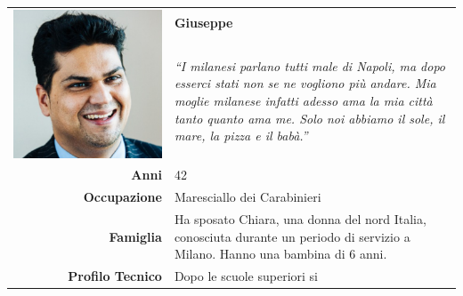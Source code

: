 \begin{table}[H]
	\begin{centering}
	\begin{tabular} { | r  p{10cm} | }
		\hline
		\multirow{2}{*}{
			\begin{minipage}{.18 \textheight}
				\vspace{0.1in}
				\includegraphics[width=\linewidth]{img/personas/giuseppe.png}
			\end{minipage}
		}
	 	& \vspace{0.1 in}\Large\textbf{Giuseppe} \\ 
		& \vspace{0.1 in}\large{\emph{``I milanesi parlano tutti male di
Napoli, ma dopo esserci stati non se ne vogliono più andare. Mia moglie
milanese infatti adesso ama la mia città tanto quanto ama me. Solo noi abbiamo il
sole, il mare, la pizza e il babà.''}}\\[8ex]
		\hline
		\textbf{Anni} & 42 \\ \hline
		\textbf{Occupazione} & Maresciallo dei Carabinieri \\ \hline
		\textbf{Famiglia} & Ha sposato Chiara, una donna del nord
Italia, conosciuta durante un periodo di servizio a Milano. Hanno una
bambina di 6 anni.\\ \hline
		\textbf{Profilo Tecnico} & Dopo le scuole superiori si

\end{tabular}
\end{centering}
\end{table}
